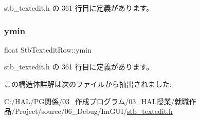  stb\+\_\+textedit.\+h の 361 行目に定義があります。

\mbox{\label{struct_stb_textedit_row_a707d331bd9dc99d64c81f71106b75eed}} 
\subsubsection{\texorpdfstring{ymin}{ymin}}
{\footnotesize\ttfamily float Stb\+Textedit\+Row\+::ymin}



 stb\+\_\+textedit.\+h の 361 行目に定義があります。



この構造体詳解は次のファイルから抽出されました\+:\begin{DoxyCompactItemize}
\item 
C\+:/\+H\+A\+L/\+P\+G関係/03\+\_\+作成プログラム/03\+\_\+\+H\+A\+L授業/就職作品/\+Project/source/06\+\_\+\+Debug/\+Im\+G\+U\+I/\mbox{\hyperlink{stb__textedit_8h}{stb\+\_\+textedit.\+h}}\end{DoxyCompactItemize}
